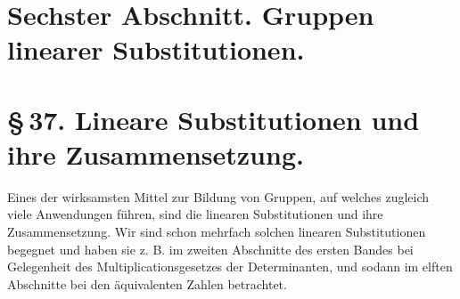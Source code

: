 \documentclass[11pt]{article}
\begin{document}
\clearpage
\section*{Sechster Abschnitt. Gruppen linearer Substitutionen.}

\section*{\S\,37. Lineare Substitutionen und ihre Zusammensetzung.}

Eines der wirksamsten Mittel zur Bildung von Gruppen, auf welches zugleich viele Anwendungen führen, sind die linearen Substitutionen und ihre Zusammensetzung. Wir sind schon mehrfach solchen linearen Substitutionen begegnet und haben sie z. B. im zweiten Abschnitte des ersten Bandes bei Gelegenheit des Multiplicationsgesetzes der Determinanten, und sodann im elften Abschnitte bei den äquivalenten Zahlen betrachtet.
\end{document}
